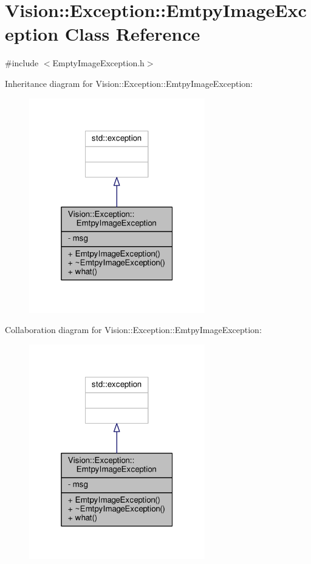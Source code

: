\hypertarget{class_vision_1_1_exception_1_1_emtpy_image_exception}{}\section{Vision\+:\+:Exception\+:\+:Emtpy\+Image\+Exception Class Reference}
\label{class_vision_1_1_exception_1_1_emtpy_image_exception}


{\ttfamily \#include $<$Empty\+Image\+Exception.\+h$>$}



Inheritance diagram for Vision\+:\+:Exception\+:\+:Emtpy\+Image\+Exception\+:\nopagebreak
\begin{figure}[H]
\begin{center}
\leavevmode
\includegraphics[width=217pt]{class_vision_1_1_exception_1_1_emtpy_image_exception__inherit__graph}
\end{center}
\end{figure}


Collaboration diagram for Vision\+:\+:Exception\+:\+:Emtpy\+Image\+Exception\+:\nopagebreak
\begin{figure}[H]
\begin{center}
\leavevmode
\includegraphics[width=217pt]{class_vision_1_1_exception_1_1_emtpy_image_exception__coll__graph}
\end{center}
\end{figure}
